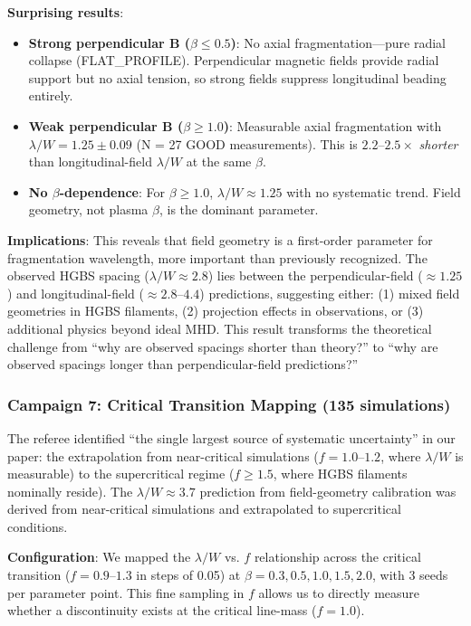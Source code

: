 \documentclass[twoside,twocolumn]{mnras}
\begin{document}
\textbf{Surprising results}:
\begin{itemize}
    \item \textbf{Strong perpendicular B ($\beta \leq 0.5$)}: No axial fragmentation---pure radial collapse (FLAT\_PROFILE). Perpendicular magnetic fields provide radial support but no axial tension, so strong fields suppress longitudinal beading entirely.
    \item \textbf{Weak perpendicular B ($\beta \geq 1.0$)}: Measurable axial fragmentation with $\lambda/W = 1.25 \pm 0.09$ (N = 27 GOOD measurements). This is $2.2$--$2.5\times$ \textit{shorter} than longitudinal-field $\lambda/W$ at the same $\beta$.
    \item \textbf{No $\beta$-dependence}: For $\beta \geq 1.0$, $\lambda/W \approx 1.25$ with no systematic trend. Field geometry, not plasma $\beta$, is the dominant parameter.
\end{itemize}

\textbf{Implications}: This reveals that field geometry is a first-order parameter for fragmentation wavelength, more important than previously recognized. The observed HGBS spacing ($\lambda/W \approx 2.8$) lies between the perpendicular-field ($\approx 1.25$) and longitudinal-field ($\approx 2.8$--$4.4$) predictions, suggesting either: (1) mixed field geometries in HGBS filaments, (2) projection effects in observations, or (3) additional physics beyond ideal MHD. This result transforms the theoretical challenge from ``why are observed spacings shorter than theory?'' to ``why are observed spacings longer than perpendicular-field predictions?''

\subsubsection{Campaign 7: Critical Transition Mapping (135 simulations)}

The referee identified ``the single largest source of systematic uncertainty'' in our paper: the extrapolation from near-critical simulations ($f = 1.0$--$1.2$, where $\lambda/W$ is measurable) to the supercritical regime ($f \geq 1.5$, where HGBS filaments nominally reside). The $\lambda/W \approx 3.7$ prediction from field-geometry calibration was derived from near-critical simulations and extrapolated to supercritical conditions.

\textbf{Configuration}: We mapped the $\lambda/W$ vs. $f$ relationship across the critical transition ($f = 0.9$--$1.3$ in steps of 0.05) at $\beta = 0.3, 0.5, 1.0, 1.5, 2.0$, with 3 seeds per parameter point. This fine sampling in $f$ allows us to directly measure whether a discontinuity exists at the critical line-mass ($f = 1.0$).
\end{document}
